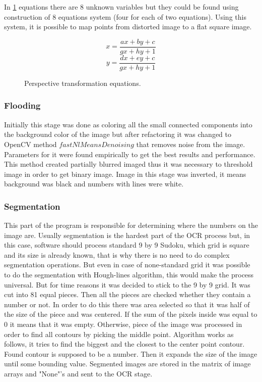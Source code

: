 \documentclass[../../main]{subfiles}
\begin{document}
In \ref{eq:persptransform} equations there are 8 unknown variables but they could be found using construction of 8 equations system (four for each of two equations). Using this system, it is possible to map points from distorted image to a flat square image.

\begin{figure} [!ht]
  \centering    
    \begin{equation}
        x = \frac{ax+by+c}{gx+hy+1}
    \end{equation}
     \begin{equation}
        y = \frac{dx+ey+c}{gx+hy+1}
    \end{equation}
  \caption{Perspective transformation equations.}
  \label{eq:persptransform}
\end{figure}

\subsubsection{Flooding}

Initially this stage was done as coloring all the small connected components into the background color of the image but after refactoring it was changed to \ac{OpenCV} method $fastNlMeansDenoising$ that removes noise from the image. Parameters for it were found empirically to get the best results and performance. This method created partially blurred imaged thus it was necessary to threshold image in order to get binary image. Image in this stage was inverted, it means background was black and numbers with lines were white.

\subsubsection{Segmentation}

This part of the program is responsible for determining where the numbers on the image are. Usually segmentation is the hardest part of the OCR process but, in this case, software should process standard 9 by 9 Sudoku, which grid is square and its size is already known, that is why there is no need to do complex segmentation operations. But even in case of none-standard grid it was possible to do the segmentation with Hough-lines algorithm, this would make the process universal. But for time reasons it was decided to stick to the 9 by 9 grid. It was cut into 81 equal pieces. Then all the pieces are checked whether they contain a number or not. In order to do this there was area selected so that it was half of the size of the piece and was centered. If the sum of the pixels inside was equal to 0 it means that it was empty. Otherwise, piece of the image was processed in order to find all contours by picking the middle point. Algorithm works as follows, it tries to find the biggest and the closest to the center point contour. Found contour is supposed to be a number. Then it expands the size of the image until some bounding value. Segmented images are stored in the matrix of image arrays and "None"'s and sent to the OCR stage.
\end{document}
